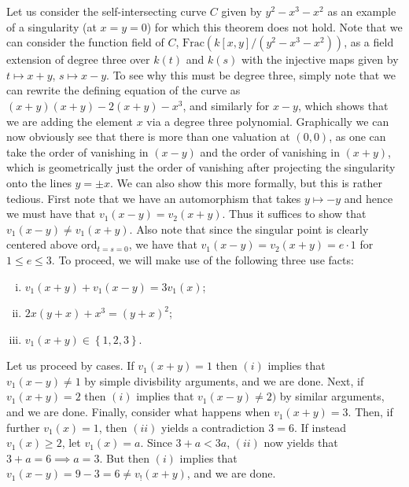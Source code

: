 \documentclass{../../mathnotes}
\begin{document}
Let us consider the self-intersecting curve $C$ given by $y^2-x^3-x^2$ as an example of a singularity (at $x=y=0$) for which this theorem
does not hold. Note that we can consider the function field of $C$, $\text{Frac}(k[x,y]/(y^2-x^3-x^2))$, as a field extension of degree
three over $k(t)$ and $k(s)$ with the injective maps given by $t\mapsto x+y$, $s\mapsto x-y$. To see why this must be degree three,
simply note that we can rewrite the defining equation of the curve as $(x+y)(x+y)-2(x+y)-x^3$, and similarly for $x-y$, which shows that we
are adding the element $x$ via a degree three polynomial. Graphically we can now obviously see that there is more than one valuation
at $(0,0)$, as one can take the order of vanishing in $(x-y)$ and the order of vanishing in $(x+y)$, which is geometrically just
the order of vanishing after projecting the singularity onto the lines $y=\pm x$. We can also show this more formally, but this is rather tedious.
First note that we have an automorphism that takes $y\mapsto -y$ and hence we must have that $v_1(x-y)=v_2(x+y)$. Thus it suffices to show
that $v_1(x-y)\neq v_1(x+y)$.
Also note that since the singular point is clearly centered above $\text{ord}_{t=s=0}$, we have that $v_1(x-y)=v_2(x+y)=e\cdot 1$ for $1\leq e\leq 3$.
To proceed, we will make use of the following three use facts:
\begin{enumerate}[(i)]
    \item $v_1(x+y)+v_1(x-y)=3v_1(x)$;
    \item $2x(y+x)+x^3=(y+x)^2$;
    \item $v_1(x+y)\in\left\{ 1,2,3 \right\}$.
\end{enumerate}
Let us proceed by cases. If $v_1(x+y)=1$ then $(i)$ implies that $v_1(x-y)\neq 1$ by simple divisbility arguments, and we are done.
Next, if $v_1(x+y)=2$ then $(i)$ implies that $v_1(x-y)\neq 2)$ by similar arguments, and we are done. Finally, consider what happens
when $v_1(x+y)=3$. Then, if further $v_1(x)=1$, then $(ii)$ yields a contradiction $3=6$. If instead $v_1(x)\geq 2$, let $v_1(x)=a$.
Since $3+a<3a$, $(ii)$ now yields that $3+a=6\implies a=3$. But then $(i)$ implies that $v_1(x-y)=9-3=6\neq v_!(x+y)$, and we are done.



\end{document}
